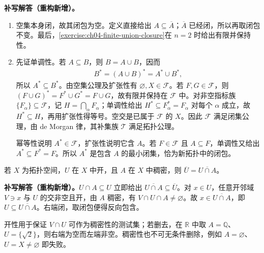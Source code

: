 \documentclass[../../main.tex]{subfiles}%
\begin{document}
\begin{solution}
\textbf{补写解答（重构新增）。}
\begin{enumerate}
\item 空集本身闭，故其闭包为空。定义直接给出 $A\subseteq\overline A$；$\overline A$ 已经闭，所以再取闭包不变。最后，\cref{exercise:ch04-finite-union-closure}在 $n=2$ 时给出有限并保持性。
\item 先证单调性。若 $A\subseteq B$，则 $B=A\cup B$，因而
\begin{align*}
B^*=(A\cup B)^*=A^*\cup B^*,
\end{align*}
所以 $A^*\subseteq B^*$。由空集公理及扩张性有 $\varnothing,X\in\mathcal F$。若 $F,G\in\mathcal F$，则 $(F\cup G)^*=F^*\cup G^*=F\cup G$，故有限并保持在 $\mathcal F$ 中。对非空指标族 $\{F_\alpha\}\subseteq\mathcal F$，记 $H=\bigcap_\alpha F_\alpha$；单调性给出 $H^*\subseteq F_\alpha^*=F_\alpha$ 对每个 $\alpha$ 成立，故 $H^*\subseteq H$，再用扩张性得等号。空交是已属于 $\mathcal F$ 的 $X$。因此 $\mathcal F$ 满足闭集公理，由 de Morgan 律，其补集族 $\mathcal T$ 满足拓扑公理。

幂等性说明 $A^*\in\mathcal F$，扩张性说明它含 $A$。若 $F\in\mathcal F$ 且 $A\subseteq F$，单调性又给出 $A^*\subseteq F^*=F$。所以 $A^*$ 是包含 $A$ 的最小闭集，恰为新拓扑中的闭包。
\end{enumerate}
\end{solution}
\begin{exercise}\label{exercise:ch04-dense-open-closure}
若 $X$ 为拓扑空间，$U$ 在 $X$ 中开，且 $A$ 在 $X$ 中稠密，则 $\overline U=\overline{U\cap A}$。
\end{exercise}
\begin{solution}
\textbf{补写解答（重构新增）。}$U\cap A\subseteq U$ 立即给出 $\overline{U\cap A}\subseteq\overline U$。对 $x\in U$，任意开邻域 $V\ni x$ 与 $U$ 的交非空且开，由 $A$ 稠密，有 $V\cap U\cap A\ne\varnothing$。故 $x\in\overline{U\cap A}$，即 $U\subseteq\overline{U\cap A}$。右端闭，取闭包便得反向包含。

开性用于保证 $V\cap U$ 可作为稠密性的测试集；若删去，在 $\mathbb R$ 中取 $A=\mathbb Q$、$U=\{\sqrt2\}$，则右端为空而左端非空。稠密性也不可无条件删除，例如 $A=\varnothing$、$U=X\ne\varnothing$ 即失败。
\end{solution}
\end{document}
